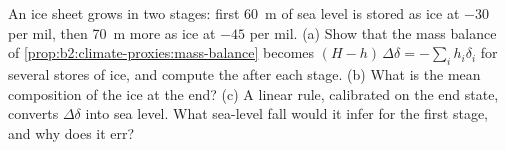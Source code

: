 \begin{exercise}[$\star\star\star$]\label{exo:b2:climate-proxies:12}
An ice sheet grows in two stages: first \qty{60}{m} of sea level is stored as ice at $-30$ per mil,
then \qty{70}{m} more as ice at $-45$ per mil. (a) Show that the mass balance of
\cref{prop:b2:climate-proxies:mass-balance} becomes $(H - h)\,\Delta\delta = -\sum_i h_i\delta_i$
for several stores of ice, and compute the  after each stage. (b) What is the mean
composition of the ice at the end? (c) A linear rule, calibrated on the end state, converts
$\Delta\delta$ into sea level. What sea-level fall would it infer for the first stage, and why does
it err?
\end{exercise}


